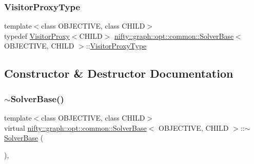 \mbox{\label{classnifty_1_1graph_1_1opt_1_1common_1_1SolverBase_ad209b469b3bc9fc0fc14e9fed4d09075}} 
\subsubsection{\texorpdfstring{Visitor\+Proxy\+Type}{VisitorProxyType}}
{\footnotesize\ttfamily template$<$class O\+B\+J\+E\+C\+T\+I\+VE, class C\+H\+I\+LD$>$ \\
typedef \hyperlink{classnifty_1_1graph_1_1opt_1_1common_1_1VisitorProxy}{Visitor\+Proxy}$<$C\+H\+I\+LD$>$ \hyperlink{classnifty_1_1graph_1_1opt_1_1common_1_1SolverBase}{nifty\+::graph\+::opt\+::common\+::\+Solver\+Base}$<$ O\+B\+J\+E\+C\+T\+I\+VE, C\+H\+I\+LD $>$\+::\hyperlink{classnifty_1_1graph_1_1opt_1_1common_1_1SolverBase_ad209b469b3bc9fc0fc14e9fed4d09075}{Visitor\+Proxy\+Type}}



\subsection{Constructor \& Destructor Documentation}
\mbox{\label{classnifty_1_1graph_1_1opt_1_1common_1_1SolverBase_a2a5a231352b9e37b2be4a4d7e05a515d}} 
\subsubsection{\texorpdfstring{$\sim$\+Solver\+Base()}{~SolverBase()}}
{\footnotesize\ttfamily template$<$class O\+B\+J\+E\+C\+T\+I\+VE, class C\+H\+I\+LD$>$ \\
virtual \hyperlink{classnifty_1_1graph_1_1opt_1_1common_1_1SolverBase}{nifty\+::graph\+::opt\+::common\+::\+Solver\+Base}$<$ O\+B\+J\+E\+C\+T\+I\+VE, C\+H\+I\+LD $>$\+::$\sim$\hyperlink{classnifty_1_1graph_1_1opt_1_1common_1_1SolverBase}{Solver\+Base} (\begin{DoxyParamCaption}{ }\end{DoxyParamCaption})\hspace{0.3cm}{\ttfamily [inline]}, {\ttfamily [virtual]}}



